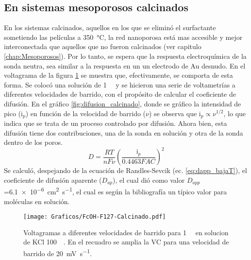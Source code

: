 	\subsection{En sistemas mesoporosos calcinados}

	 En los sistemas calcinados, aquellos en los que se eliminó el surfactante sometiendo las películas a \SI{350}{\celsius}, la red nanoporosa está mas accesible y mejor interconectada que aquellos que no fueron calcinados (ver capitulo \ref{chap:Mesoporosos}). Por lo tanto, se espera que la respuesta electroquímica de la sonda neutra, sea similar a la respuesta en un un electrodo de Au desnudo. En el voltagrama de la figura \ref{fig:fc_calcinado} se muestra que, efectivamente, se comporta de esta forma. Se colocó una solución de \fc\space \SI{1}{\milli\Molar} y se hicieron una serie de voltametrías a diferentes velocidades de barrido, con el propósito de calcular el coeficiente de difusión. En el gráfico \ref{fig:difusion_calcinado}, donde se gráfico la intensidad de pico (i$_p$) en función de la velocidad de barrido ($\nu$) se observa que $\text{i}_p \propto \nu^{1/2}$, lo que indica que se trata de un proceso controlado por difusión. Ahora bien, esta difusión tiene dos contribuciones, una de la sonda en solución y otra de la sonda dentro de los poros. 
		 \begin{equation}
					D=\frac{RT}{nF\nu}\left(\frac{\text{i}_p}{0.4463FAC}\right)^2
					\label{eq:dapp_bajaT}
			\end{equation}  
	 Se calculó, despejando de la ecuación de Randles-Sevcik (ec. \ref{eq:dapp_bajaT}), el coeficiente de difusión aparente ($D_{ap}$), el cual dió como valor $D_{app}$=\SI{6,1e-6}{\square\cm\per\second}, el cual es según la bibliografía un típico valor para moléculas en solución. \cite{koryta1993,Otal2006}

			\begin{figure}[ht]
				\centering
		 	    \texttt{[image: Graficos/FcOH-F127-Calcinado.pdf]}
		        \caption[Voltagrama para \fc\space en \pdm\space calcinadas]{Voltagramas a diferentes velocidades de barrido para \fc\space \SI{1}{\milli\Molar} en solucion de KCl \SI{100}{\milli\Molar}. En el recuadro se amplia la VC para una velocidad de barrido de \SI{20}{\milli\volt\per\second}.}
		        \label{fig:fc_calcinado}
		      	\end{figure}

